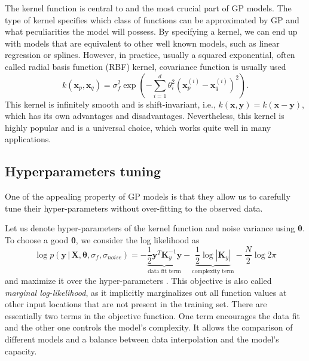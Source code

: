 The kernel function is central to and the most crucial part of GP models.
The type of kernel specifies which class of functions can be approximated by GP
and what peculiarities the model will possess.
By specifying a kernel, we can end up with models that are equivalent to other
well known models, such as linear regression or splines.
However, in practice, usually a squared exponential, often called radial basis function (RBF) kernel, covariance function is usually used
\begin{equation}
  \label{eq:covariance_function}
  k(\mathbf{x}_p, \mathbf{x}_q) = \sigma_f^2 \exp \left ( -\sum_{i = 1}^d \theta_i^2 (\mathbf{x}_p^{(i)} - \mathbf{x}_q^{(i)})^2 \right ).
\end{equation}
This kernel is infinitely smooth and is shift-invariant,
i.e., $k(\mathbf{x, y}) = k(\mathbf{x - y})$, which has its own advantages and disadvantages.
Nevertheless, this kernel is highly popular and is a universal choice, which works quite well in many applications.


\subsection{Hyperparameters tuning}
One of the appealing property of GP models is that they allow us to
carefully tune their hyper-parameters without over-fitting to the observed data.

Let us denote hyper-parameters of the kernel function and noise variance using $\bm{\theta}$.
To choose a good $\bm{\theta}$, we consider the log likelihood as
\begin{equation}
  \label{eq:loglikelihood}
    \log p(\mathbf{y} \, | \, \mathbf{X}, \boldsymbol{\theta}, \sigma_f, \sigma_{noise}) =
    -\underbrace{\frac12 \mathbf{y}^T \mathbf{K}_y^{-1}\mathbf{y}}_{\text{data fit term}}
    - \underbrace{\frac12 \log |\mathbf{K}_y|}_{\text{complexity term}}
    - \frac{N}{2} \log 2 \pi
\end{equation}
and maximize it over the hyper-parameters \citep{rasmussen2006gaussian}.
This objective is also called {\em marginal log-likelihood}, as it implicitly
marginalizes out all function values at other input locations that are not present
in the training set.
There are essentially two terms in the objective function.
One term encourages the data fit and the other one controls the model's complexity.
It allows the comparison of different models and a balance between data interpolation and
the model's capacity.

